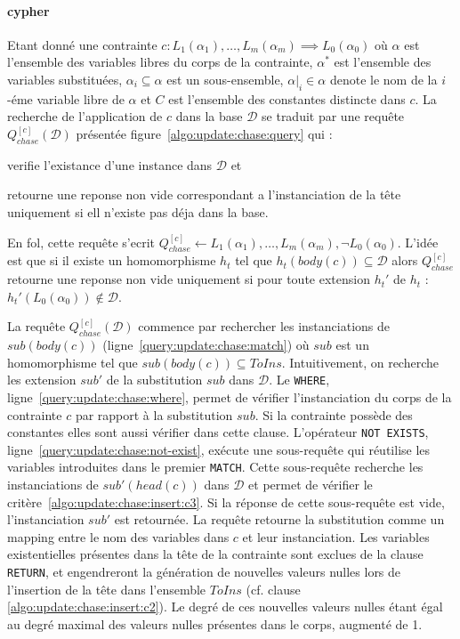 \paragraph{\gls{cypher}}
Etant donné une contrainte $c : L_1(\alpha_1), \dots, L_m(\alpha_m) \implies L_0(\alpha_0)$ où $\alpha$ est l'ensemble des variables libres du corps de la contrainte, $\alpha^*$ est l'ensemble des variables substituées, $\alpha_i \subseteq \alpha$ est un sous-ensemble, $\alpha|_i \in \alpha$ denote le nom de la $i$-éme variable libre de $\alpha$ et $C$ est l'ensemble des constantes distincte dans $c$.
La recherche de l'application de $c$ dans la base $\mathcal{D}$ se traduit par une requête $Q_{chase}^{[c]}(\mathcal{D})$ présentée figure~\ref{algo:update:chase:query} qui :
\begin{enumerate*}[label=(\roman*)]
    \item verifie l'existance d'une instance dans $\mathcal{D}$ et
    \item retourne une reponse non vide correspondant a l'instanciation de la tête uniquement si ell n'existe pas déja dans la base.
\end{enumerate*}
En \gls{fol}, cette requête s'ecrit $Q_{chase}^{[c]} \gets L_1(\alpha_1), \dots, L_m(\alpha_m), \lnot L_0(\alpha_0)$.
L'idée est que si il existe un homomorphisme $h_t$ tel que $h_t(body(c)) \subseteq \mathcal{D}$ alors $Q_{chase}^{[c]}$ retourne une reponse non vide uniquement si pour toute extension $h_t'$ de $h_t$ : $h_t'(L_0(\alpha_0)) \notin \mathcal{D}$.

La requête $Q_{chase}^{[c]}(\mathcal{D})$ commence par rechercher les instanciations de $sub(body(c))$ (ligne~\ref{query:update:chase:match}) où $sub$ est un homomorphisme tel que $sub(body(c)) \subseteq ToIns$.
Intuitivement, on recherche les extension $sub'$ de la substitution $sub$ dans $\mathcal{D}$.
Le \verb|WHERE|, ligne~\ref{query:update:chase:where}, permet de vérifier l'instanciation du corps de la contrainte $c$ par rapport à la substitution $sub$.
Si la contrainte possède des constantes elles sont aussi vérifier dans cette clause.
L'opérateur \verb|NOT EXISTS|, ligne~\ref{query:update:chase:not-exist}, exécute une sous-requête qui réutilise les variables introduites dans le premier \verb|MATCH|.
Cette sous-requête recherche les instanciations de $sub'(head(c))$ dans $\mathcal{D}$ et permet de vérifier le critère~\ref{algo:update:chase:insert:c3}.
Si la réponse de cette sous-requête est vide, l'instanciation $sub'$ est retournée.
La requête retourne la substitution comme un mapping entre le nom des variables dans $c$ et leur instanciation.
Les variables existentielles présentes dans la tête de la contrainte sont exclues de la clause \verb|RETURN|, et  engendreront la génération de nouvelles valeurs nulles lors de l'insertion de la tête dans l'ensemble $ToIns$ (cf. clause \ref{algo:update:chase:insert:c2}).
Le degré de ces nouvelles valeurs nulles étant égal au degré maximal des valeurs nulles présentes dans le corps, augmenté de 1.

